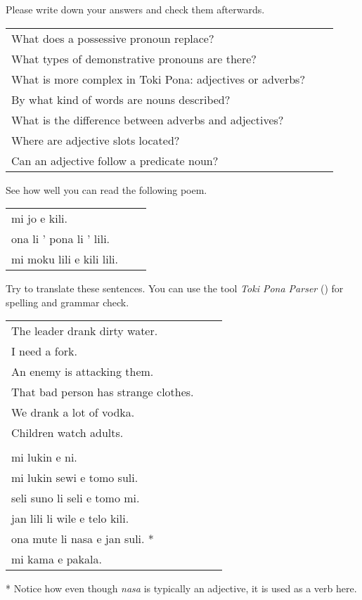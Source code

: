 Please write down your answers and check them afterwards. 

\begin{supertabular}{p{5,5cm}|ll}
What does a possessive pronoun replace? &&  \\ %
What types of demonstrative pronouns are there? &&  \\ %
What is more complex in Toki Pona: adjectives or adverbs? &&  \\ %
By what kind of words are nouns described? &&   \\ %
What is the difference between adverbs and adjectives? &&  \\ %
Where are adjective slots located? &&  \\ %
Can an adjective follow a predicate noun? &&  \\ %
\end{supertabular}

See how well you can read the following poem. 

\begin{supertabular}{p{5,5cm}|ll}
mi jo e kili. && \\ %
ona li ' pona li ' lili. && \\ %
mi moku lili e kili lili. && \\ %
\end{supertabular} 

Try to translate these sentences. 
You can use the tool \textit{Toki Pona Parser} (\cite{www:rowa:02}) for spelling and grammar check. 

\begin{supertabular}{p{5,5cm}|ll}
The leader drank dirty water. &&   \\ %
I need a fork.   &&   \\ %
An enemy is attacking them.   &&   \\ %
That bad person has strange clothes.   &&  \\  %
We drank a lot of vodka.   &&   \\ %
Children watch adults.   &&   \\ %
 && \\ %
mi lukin e ni. &&  \\ %
mi lukin sewi e tomo suli.  &&    \\ %
seli suno li seli e tomo mi.  &&   \\ %
jan lili li wile e telo kili.  &&  \\ %
ona mute li nasa e jan suli. * &&  \\ %
mi kama e pakala. &&  \\ %
\end{supertabular} 

* Notice how even though \textit{nasa} is typically an adjective, it is used as a verb here. 
